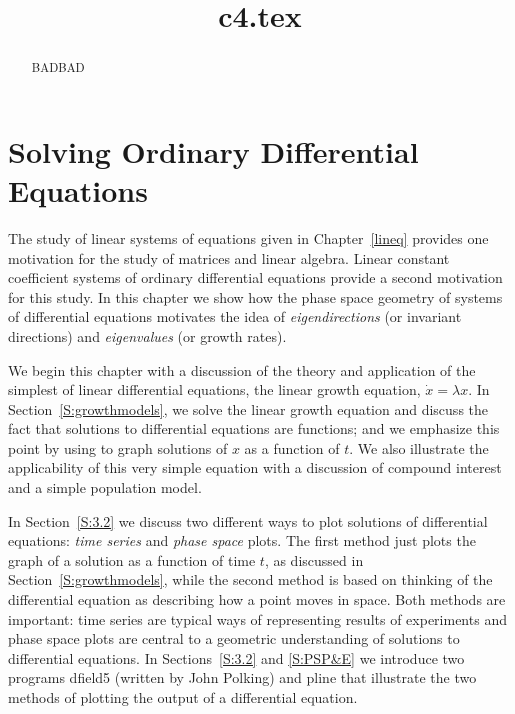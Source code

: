 \documentclass{ximera}
\title{c4.tex}
\begin{document}
\begin{abstract}
BADBAD
\end{abstract}
\maketitle

\chapter{Solving Ordinary Differential Equations}
\label{chap:SolveOdes}

\normalsize

The study of linear systems of equations given in Chapter~\ref{lineq}
provides one motivation for the study of matrices and linear algebra.  
Linear constant coefficient systems of ordinary differential equations 
provide a second motivation for this study.  In this chapter we
show how the phase space geometry of systems of differential equations
motivates the idea of {\em eigendirections} (or invariant directions) and
{\em eigenvalues\/} (or growth rates).  

We begin this chapter with a discussion of the theory and application
of the simplest of linear differential equations, the linear growth equation,
$\dot{x}=\lambda x$.  In Section~\ref{S:growthmodels}, we solve the linear
growth equation and discuss the fact that solutions to differential equations
are functions; and we emphasize this point by using \Matlab to graph
solutions of $x$ as a function of $t$.  We also illustrate the applicability
of this very simple equation with a discussion of compound interest and
a simple population model.

In Section~\ref{S:3.2} we discuss two different ways to plot solutions of
differential equations: {\em time series\/} and {\em phase space\/} plots.
The first method just plots the graph of a solution as a function
of time $t$, as discussed in Section~\ref{S:growthmodels}, while the second
method is based on thinking of the differential equation as describing
how a point moves in space.  Both methods are important: time series are
typical ways of representing results of experiments and phase space plots
are central to a geometric understanding of solutions to differential
equations.  In Sections~\ref{S:3.2} and \ref{S:PSP&E} we introduce two \Matlab
programs {\sf dfield5} (written by John Polking) and 
{\sf pline} that illustrate the two methods of plotting the output of a 
differential equation.
\end{document}
